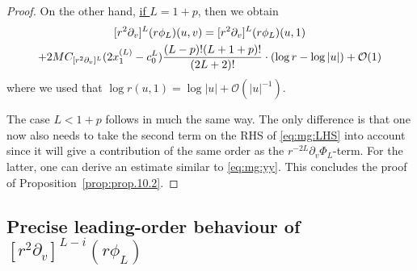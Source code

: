 \documentclass[11pt,english]{article}
\numberwithin{equation}{section}
\theoremstyle{remark}
\theoremstyle{plain}
\theoremstyle{remark}
\newcommand{\pv}{\partial_v}
\renewcommand{\(}{\left(}
\renewcommand{\)}{\right)}
\begin{document}
\begin{proof}
On the other hand, \underline{if $L=1+p$}, then we obtain
\begin{multline}\label{eq:mg:pvLbound2}
[r^2\pv]^L(r\phi_L)(u,v)=[r^2\pv]^L(r\phi_L)(u,1)\\
+2M\cv{L}(2x_1^{(L)}-c_0^L)\frac{(L-p)!(L+1+p)!}{(2L+2)!}\cdot (\log r-\log|u|) +\mathcal O(1)%
\end{multline} 
where we used that $\log r(u,1)=\log |u|+\mathcal O(|u|^{-1})$.

The case \underline{$L<1+p$} follows in much the same way.
 The only difference is that one now also needs to take the second term on the RHS of \eqref{eq:mg:LHS} into account since it will give a contribution of the same order as the  $r^{-2L}\pv\Phi_L$-term. 
 For the latter, one can derive an estimate similar to \eqref{eq:mg:yy}. 
 This concludes the proof of Proposition~\ref{prop:prop.10.2}.
\end{proof}
\subsection{Precise leading-order behaviour of \texorpdfstring{$[r^2\pv]^{L-i}(r\phi_L)$}{(r2 d/dv)L-i(r phi-L)}}\label{sec:mg:y}
\end{document}
